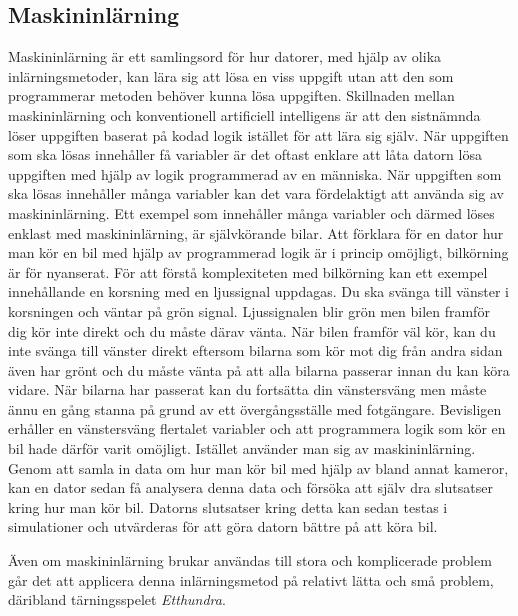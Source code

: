 \documentclass[12pt,a4paper]{article}
\begin{document}
    \subsection{Maskininlärning}\label{subsec:maskininlarning} 
      Maskininlärning är ett samlingsord för hur datorer, med hjälp av olika inlärningsmetoder, kan lära sig att lösa en viss uppgift utan att den som programmerar metoden behöver kunna lösa uppgiften. Skillnaden mellan maskininlärning och konventionell artificiell intelligens är att den sistnämnda löser uppgiften baserat på kodad logik istället för att lära sig själv. När uppgiften som ska lösas innehåller få variabler är det oftast enklare att låta datorn lösa uppgiften med hjälp av logik programmerad av en människa. När uppgiften som ska lösas innehåller många variabler kan det vara fördelaktigt att använda sig av maskininlärning. Ett exempel som innehåller många variabler och därmed löses enklast med maskininlärning, är självkörande bilar. Att förklara för en dator hur man kör en bil med hjälp av programmerad logik är i princip omöjligt, bilkörning är för nyanserat. För att förstå komplexiteten med bilkörning kan ett exempel innehållande en korsning med en ljussignal uppdagas. Du ska svänga till vänster i korsningen och väntar på grön signal. Ljussignalen blir grön men bilen framför dig kör inte direkt och du måste därav vänta. När bilen framför väl kör, kan du inte svänga till vänster direkt eftersom bilarna som kör mot dig från andra sidan även har grönt och du måste vänta på att alla bilarna passerar innan du kan köra vidare. När bilarna har passerat kan du fortsätta din vänstersväng men måste ännu en gång stanna på grund av ett övergångsställe med fotgängare. Bevisligen erhåller en vänstersväng flertalet variabler och att programmera logik som kör en bil hade därför varit omöjligt. Istället använder man sig av maskininlärning. Genom att samla in data om hur man kör bil med hjälp av bland annat kameror, kan en dator sedan få analysera denna data och försöka att själv dra slutsatser kring hur man kör bil. Datorns slutsatser kring detta kan sedan testas i simulationer och utvärderas för att göra datorn bättre på att köra bil. 
      
      Även om maskininlärning brukar användas till stora och komplicerade problem går det att applicera denna inlärningsmetod på relativt lätta och små problem, däribland tärningsspelet \emph{Etthundra}. 
\end{document}
